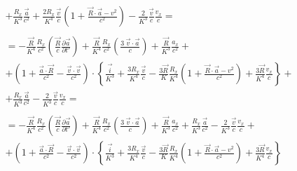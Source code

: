 \documentclass[11pt]{article}
\begin{document}
\[\begin{align}
 & +\frac{{{R}_{x}}}{{{K}^{3}}}\frac{\overrightarrow{a}}{{{c}^{2}}}+\frac{2{{R}_{x}}}{{{K}^{4}}}\frac{\overrightarrow{v}}{c}\left( 1+\frac{\overrightarrow{R}\cdot \overrightarrow{a}-{{v}^{2}}}{{{c}^{2}}} \right)-\frac{2}{{{K}^{3}}}\frac{\overrightarrow{v}}{c}\frac{{{v}_{x}}}{c}= \\ 
 &  \\ 
 & =-\frac{\overrightarrow{R}}{{{K}^{4}}}\frac{{{R}_{x}}}{{{c}^{2}}}\left( \frac{\overrightarrow{R}}{c}\frac{\partial \overrightarrow{a}}{\partial t'} \right)+\frac{\overrightarrow{R}}{{{K}^{4}}}\frac{{{R}_{x}}}{{{c}^{2}}}\left( \frac{3\ \overrightarrow{v}\cdot \overrightarrow{a}}{c} \right)+\frac{\overrightarrow{R}}{{{K}^{3}}}\frac{{{a}_{x}}}{{{c}^{2}}}+ \\ 
 & +\left( 1+\frac{\overrightarrow{a}\cdot \overrightarrow{R}}{{{c}^{2}}}-\frac{\overrightarrow{v}\cdot \overrightarrow{v}}{{{c}^{2}}} \right)\cdot \left\{ \frac{\overrightarrow{i}}{{{K}^{3}}}+\frac{3{{R}_{x}}}{{{K}^{4}}}\frac{\overrightarrow{v}}{c}-\frac{3\overrightarrow{R}}{K}\frac{{{R}_{x}}}{{{K}^{4}}}\left( 1+\frac{\overrightarrow{R}\cdot \overrightarrow{a}-{{v}^{2}}}{{{c}^{2}}} \right)+\frac{3\overrightarrow{R}}{{{K}^{4}}}\frac{{{v}_{x}}}{c} \right\}+ \\ 
 & +\frac{{{R}_{x}}}{{{K}^{3}}}\frac{\overrightarrow{a}}{{{c}^{2}}}-\frac{2}{{{K}^{3}}}\frac{\overrightarrow{v}}{c}\frac{{{v}_{x}}}{c}= \\ 
 &  \\ 
 & =-\frac{\overrightarrow{R}}{{{K}^{4}}}\frac{{{R}_{x}}}{{{c}^{2}}}\left( \frac{\overrightarrow{R}}{c}\frac{\partial \overrightarrow{a}}{\partial t'} \right)+\frac{\overrightarrow{R}}{{{K}^{4}}}\frac{{{R}_{x}}}{{{c}^{2}}}\left( \frac{3\ \overrightarrow{v}\cdot \overrightarrow{a}}{c} \right)+\frac{\overrightarrow{R}}{{{K}^{3}}}\frac{{{a}_{x}}}{{{c}^{2}}}+\frac{{{R}_{x}}}{{{K}^{3}}}\frac{\overrightarrow{a}}{{{c}^{2}}}-\frac{2}{{{K}^{3}}}\frac{\overrightarrow{v}}{c}\frac{{{v}_{x}}}{c}+ \\ 
 & +\left( 1+\frac{\overrightarrow{a}\cdot \overrightarrow{R}}{{{c}^{2}}}-\frac{\overrightarrow{v}\cdot \overrightarrow{v}}{{{c}^{2}}} \right)\cdot \left\{ \frac{\overrightarrow{i}}{{{K}^{3}}}+\frac{3{{R}_{x}}}{{{K}^{4}}}\frac{\overrightarrow{v}}{c}-\frac{3\overrightarrow{R}}{K}\frac{{{R}_{x}}}{{{K}^{4}}}\left( 1+\frac{\overrightarrow{R}\cdot \overrightarrow{a}-{{v}^{2}}}{{{c}^{2}}} \right)+\frac{3\overrightarrow{R}}{{{K}^{4}}}\frac{{{v}_{x}}}{c} \right\} \\ 
 &  \\ 
\end{align}\]
\end{document}
